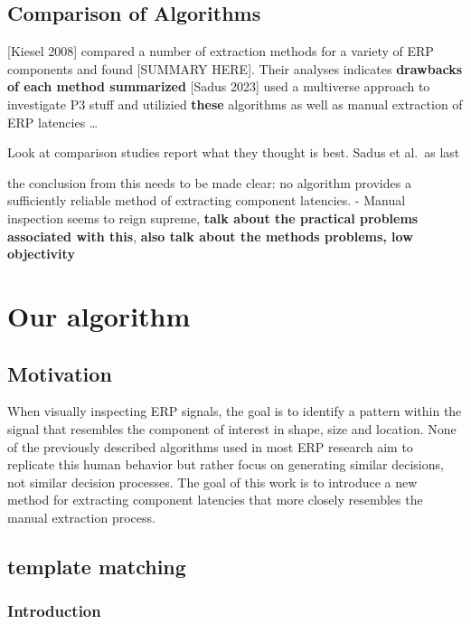 \documentclass[
  man,floatsintext]{apa7}
\begin{document}
\hypertarget{comparison-of-algorithms}{%
\subsection{Comparison of Algorithms}\label{comparison-of-algorithms}}

{[}Kiesel 2008{]} compared a number of extraction methods for a variety of ERP components and found {[}SUMMARY HERE{]}. Their analyses indicates \textbf{drawbacks of each method summarized}
{[}Sadus 2023{]} used a multiverse approach to investigate P3 stuff and utilizied \textbf{these} algorithms as well as manual extraction of ERP latencies \ldots{}

Look at comparison studies report what they thought is best. Sadus et al.~as last

the conclusion from this needs to be made clear: no algorithm provides a sufficiently reliable method of extracting component latencies. - Manual inspection seems to reign supreme, \textbf{talk about the practical problems associated with this}, \textbf{also talk about the methods problems, low objectivity}

\hypertarget{our-algorithm}{%
\section{Our algorithm}\label{our-algorithm}}

\hypertarget{motivation}{%
\subsection{Motivation}\label{motivation}}

When visually inspecting ERP signals, the goal is to identify a pattern within the signal that resembles the component of interest in shape, size and location. None of the previously described algorithms used in most ERP research aim to replicate this human behavior but rather focus on generating similar decisions, not similar decision processes. The goal of this work is to introduce a new method for extracting component latencies that more closely resembles the manual extraction process.

\hypertarget{template-matching}{%
\subsection{template matching}\label{template-matching}}

\hypertarget{introduction}{%
\subsubsection{Introduction}\label{introduction}}
\end{document}

